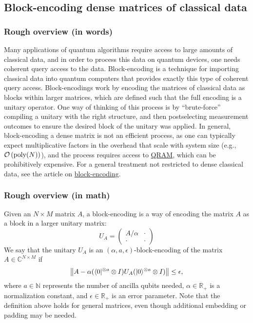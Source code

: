 \begin{refsection}

\subsection{Block-encoding dense matrices of classical data}\label{prim:BlockEncodingsClassical}

\subsubsection*{Rough overview (in words)}

Many applications of quantum algorithms require access to large amounts of classical data, and in order to process this data on quantum devices, one needs coherent query access to the data. Block-encoding is a technique for importing classical data into quantum computers that provides exactly this type of coherent query access. Block-encodings work by encoding the matrices of classical data as blocks within larger matrices, which are defined such that the full encoding is a unitary operator. One way of thinking of this process is by ``brute-force'' compiling a unitary with the right structure, and then postselecting measurement outcomes to ensure the desired block of the unitary was applied. In general, block-encoding a dense matrix is not an efficient process, as one can typically expect multiplicative factors in the overhead that scale with system size (e.g., $\mathcal{O}\left( \mathrm{poly}(N) \right)$), and the process requires access to \hyperref[prim:QRAM]{QRAM}, which can be prohibitively expensive. For a general treatment not restricted to dense classical data, see the article on \hyperref[prim:BlockEncodings]{block-encoding}.


\subsubsection*{Rough overview (in math)}

Given an $N\times M$ matrix $A$, a block-encoding is a way of encoding the matrix $A$ as a block in a larger unitary matrix:
\begin{equation}
U_A = \begin{pmatrix}A/\alpha & \cdot \\ \cdot & \cdot \end{pmatrix}
\end{equation}
We say that the unitary $U_A$ is an $(\alpha, a, \epsilon)$-block-encoding of the matrix $A\in\mathbb{C}^{N\times M}$ if 
\begin{equation}
\left\lVert A - \alpha (\langle0\rvert^{\otimes a} \otimes I )U_A(\lvert0\rangle^{\otimes a} \otimes I)\right\rVert \leq \epsilon,
\end{equation}
where $a\in\mathbb{N}$ represents the number of ancilla qubits needed, $\alpha\in\mathbb{R}_+$ is a normalization constant, and $\epsilon\in\mathbb{R}_+$ is an error parameter. Note that the definition above holds for general matrices, even though additional embedding or padding may be needed.


\end{refsection}
